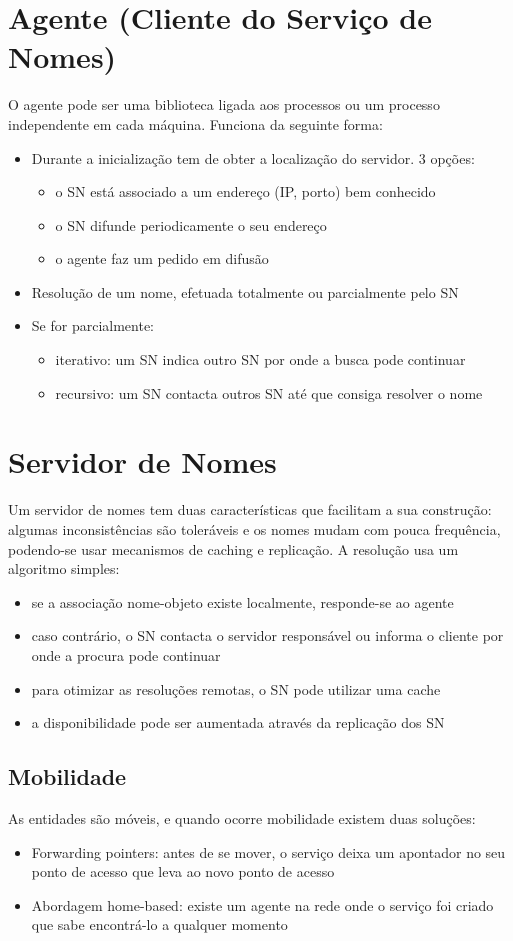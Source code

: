 \documentclass[10pt,a4paper]{report}
\begin{document}
\section{Agente (Cliente do Serviço de Nomes)}
O agente pode ser uma biblioteca ligada aos processos ou um processo independente em cada máquina. Funciona da seguinte forma:
\begin{itemize}
\item Durante a inicialização tem de obter a localização do servidor. 3 opções:
\begin{itemize}
\item o SN está associado a um endereço (IP, porto) bem conhecido
\item o SN difunde periodicamente o seu endereço
\item o agente faz um pedido em difusão
\end{itemize}
\item Resolução de um nome, efetuada totalmente ou parcialmente pelo SN
\item Se for parcialmente:
\begin{itemize}
\item iterativo: um SN indica outro SN por onde a busca pode continuar
\item recursivo: um SN contacta outros SN até que consiga resolver o nome
\end{itemize}
\end{itemize}
\section{Servidor de Nomes}
Um servidor de nomes tem duas características que facilitam a sua construção: algumas inconsistências são toleráveis e os nomes mudam com pouca frequência, podendo-se usar mecanismos de caching e replicação. A resolução usa um algoritmo simples:
\begin{itemize}
\item se a associação nome-objeto existe localmente, responde-se ao agente
\item caso contrário, o SN contacta o servidor responsável ou informa o cliente
por onde a procura pode continuar
\item para otimizar as resoluções remotas, o SN pode utilizar uma cache
\item a disponibilidade pode ser aumentada através da replicação dos SN
\end{itemize}
\subsection{Mobilidade}
As entidades são móveis, e quando ocorre mobilidade existem duas soluções:
\begin{itemize}
\item Forwarding pointers: antes de se mover, o serviço deixa um apontador no seu ponto de acesso que leva ao novo ponto de acesso
\item Abordagem home-based: existe um agente na rede onde o serviço foi criado que sabe encontrá-lo a qualquer momento
\end{itemize}
\end{document}
